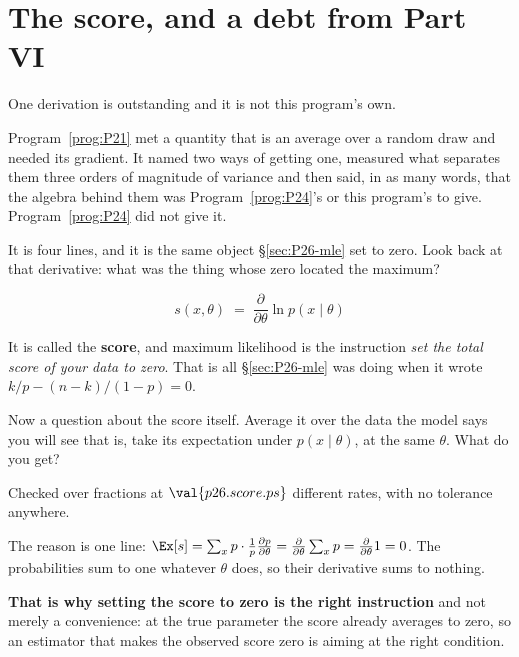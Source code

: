\section{The score, and a debt from Part VI}
\label{sec:P26-score}

\begin{fr}
One derivation is outstanding and it is not this program's own.

Program~\ref{prog:P21} met a quantity that is an average over a random draw
and needed its gradient. It named two ways of getting one, measured what
separates them \dash{} three orders of magnitude of variance \dash{} and
then said, in as many words, that the algebra behind them was
Program~\ref{prog:P24}'s or this program's to give. Program~\ref{prog:P24}
did not give it.

It is four lines, and it is the same object \S\ref{sec:P26-mle} set to zero.
Look back at that derivative: what was the thing whose zero located the
maximum?
\dotline
\nextframe
\end{fr}

\begin{fr}

\[ s(x, \theta) \;=\; \frac{\partial}{\partial \theta}
   \ln p(x \mid \theta) \]

It is called the \textbf{score}, and maximum likelihood is the instruction
\emph{set the total score of your data to zero}. That is all
\S\ref{sec:P26-mle} was doing when it wrote $k/p - (n-k)/(1-p) = 0$.

Now a question about the score itself. Average it over the data the model
says you will see \dash{} that is, take its expectation under
$p(x \mid \theta)$, at the same $\theta$. What do you get?
\dotline
\nextframe
\end{fr}

\begin{fr}

Checked over fractions at $\val{p26.score.ps}$ different rates, with no
tolerance anywhere.

The reason is one line: $\Ex[s] = \sum_x p \cdot \frac{1}{p}
\frac{\partial p}{\partial \theta} = \frac{\partial}{\partial \theta}
\sum_x p = \frac{\partial}{\partial \theta} 1 = 0$. The probabilities sum to
one whatever $\theta$ does, so their derivative sums to nothing.

\textbf{That is why setting the score to zero is the right instruction} and
not merely a convenience: at the true parameter the score already averages
to zero, so an estimator that makes the observed score zero is aiming at the
right condition.
\end{fr}

